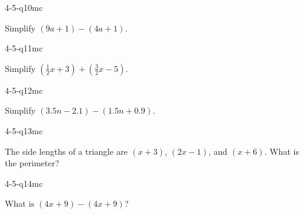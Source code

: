 \begin{practiceQuestion}{4-5-q10}{mc}
\begin{questionText}
Simplify $(9a + 1) - (4a + 1)$.
\end{questionText}
\end{practiceQuestion}

\begin{practiceQuestion}{4-5-q11}{mc}
\begin{questionText}
Simplify $(\frac{1}{2}x + 3) + (\frac{3}{2}x - 5)$.
\end{questionText}
\end{practiceQuestion}

\begin{practiceQuestion}{4-5-q12}{mc}
\begin{questionText}
Simplify $(3.5n - 2.1) - (1.5n + 0.9)$.
\end{questionText}
\end{practiceQuestion}

\begin{practiceQuestion}{4-5-q13}{mc}
\begin{questionText}
The side lengths of a triangle are $(x + 3)$, $(2x - 1)$, and $(x + 6)$. What is the perimeter?
\end{questionText}
\end{practiceQuestion}

\begin{practiceQuestion}{4-5-q14}{mc}
\begin{questionText}
What is $(4x + 9) - (4x + 9)$?
\end{questionText}
\end{practiceQuestion}

